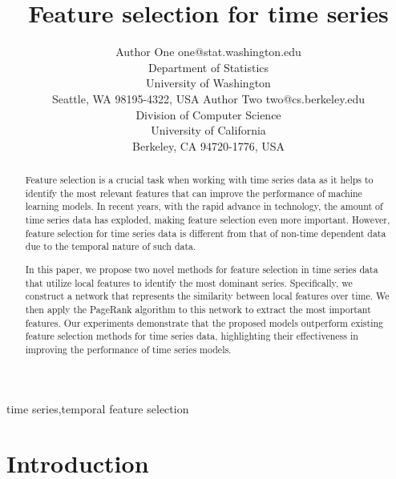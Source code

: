 \documentclass[twoside,11pt]{article}
\begin{document}
\title{Feature selection for time series}

\author{\name Author One \email one@stat.washington.edu \\
       \addr Department of Statistics\\
       University of Washington\\
       Seattle, WA 98195-4322, USA
       \AND
       \name Author Two \email two@cs.berkeley.edu \\
       \addr Division of Computer Science\\
       University of California\\
       Berkeley, CA 94720-1776, USA}


\maketitle

\begin{abstract}%
Feature selection is a crucial task when working with time series data as it helps to identify
the most relevant features that can improve the performance of machine learning models.
In recent years, with the rapid advance in technology, the amount of time series data has
exploded, making feature selection even more important. However, feature selection for
time series data is different from that of non-time dependent data due to the temporal
nature of such data.

In this paper, we propose two novel methods for feature selection in time series data that utilize local features to identify the most dominant series. Specifically, we construct a network that represents the similarity between local features over time. We then apply the PageRank algorithm to this network to extract the most important features. Our experiments demonstrate that the proposed models outperform existing feature selection methods for time series data, highlighting their effectiveness in improving the performance of time series models.
\end{abstract}

\begin{keywords}
  time series,temporal feature selection
\end{keywords}

\section{Introduction}
\end{document}
